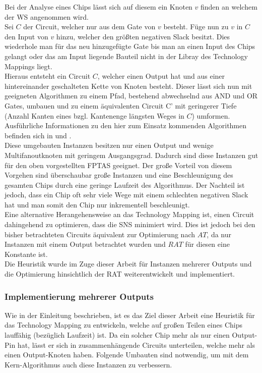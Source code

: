 \documentclass[11pt, a4paper, german]{article}
\newcommand{\TM}{Technology  Mapping }
\begin{document}
Bei der Analyse eines Chips lässt sich auf diesem ein Knoten $v$ finden an welchem der WS angenommen wird.\\
Sei $C$ der Circuit, welcher nur aus dem Gate von $v$ besteht. Füge nun zu $v$ in $C$ den Input von $v$ hinzu, welcher den größten negativen Slack besitzt. Dies wiederhole man für das neu hinzugefügte Gate bis man an einen Input des Chips gelangt oder das am Input liegende Bauteil nicht in der Libray des Technology Mappings liegt. \\
Hieraus entsteht ein Circuit $C$, welcher einen Output hat und aus einer hintereinander geschalteten Kette von Knoten besteht. Dieser lässt sich nun mit geeigneten Algorithmen zu einem Pfad, bestehend abwechselnd aus AND und OR Gates,  umbauen und  zu einem äquivalenten Circuit C' mit geringerer Tiefe (Anzahl Kanten eines bzgl. Kantenenge längsten  Weges in $C$) umformen. Ausführliche Informationen zu den hier zum Einsatz kommenden Algorithmen befinden sich in \cite{Werber} und \cite{Hermann}.\\

Diese umgebauten Instanzen besitzen nur einen Output und wenige Multifanoutknoten mit geringem Ausgangsgrad. Dadurch sind diese Instanzen gut für den oben vorgestellten FPTAS geeignet. Der große Vorteil von diesem Vorgehen sind überschaubar große Instanzen und eine Beschleunigung des gesamten Chips durch eine geringe Laufzeit des Algorithmus. Der Nachteil ist jedoch, dass ein Chip oft sehr viele Wege mit einem schlechten negativen Slack hat und man somit den Chip nur inkrementell beschleunigt.\\

Eine alternative Herangehensweise an das \TM ist, einen Circuit dahingehend zu optimieren, dass die SNS minimiert wird. Dies ist jedoch bei den bisher betrachteten Circuits äquivalent zur Optimierung nach $AT$, da nur Instanzen mit einem Output betrachtet wurden und $RAT$ für diesen eine Konstante ist.\\
Die Heuristik wurde im Zuge dieser Arbeit für Instanzen mehrerer Outputs und die Optimierung hinsichtlich der RAT weiterentwickelt und implementiert. 

\subsubsection{Implementierung mehrerer Outputs}
\label{subsec:mehrere_outputs}
Wie in der Einleitung beschrieben, ist es das Ziel dieser Arbeit eine Heuristik für das \TM zu entwickeln, welche auf großen Teilen eines Chips lauffähig (bezüglich Laufzeit) ist. Da ein solcher Chip mehr als nur einen Output-Pin hat, lässt er sich in zusammenhängende Circuits unterteilen, welche mehr als einen Output-Knoten haben. Folgende Umbauten sind notwendig, um mit dem Kern-Algorithmus auch diese Instanzen zu verbessern.\\
\end{document}
